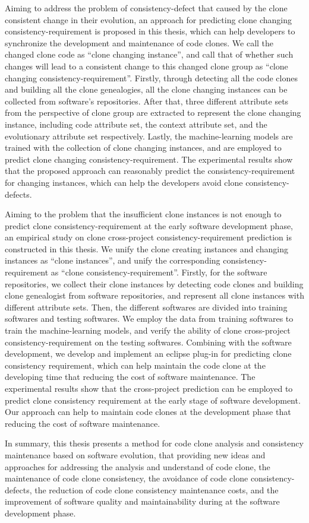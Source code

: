 {Aiming to address the problem of consistency-defect that caused by the clone consistent change in their evolution, an approach for predicting clone changing consistency-requirement is proposed in this thesis, which can help developers to synchronize the development and maintenance of code clones. 
We call the changed clone code as ``clone changing instance'', and call that of whether such changes will lead to a consistent change to this changed clone group as ``clone changing consistency-requirement''.
Firstly, through detecting all the code clones and building all the clone genealogies, all the clone changing instances can be collected from software's repositories.
After that, three different attribute sets from the perspective of clone group are extracted to represent the clone changing instance, including code attribute set, the context attribute set, and the evolutionary attribute set respectively.
Lastly, the machine-learning models are trained with the collection of clone changing instances, and are employed to predict clone changing consistency-requirement.
The experimental results show that the proposed approach can reasonably predict the consistency-requirement for changing instances, which can help the developers avoid clone consistency-defects.

Aiming to the problem that the insufficient clone instances is not enough to predict clone consistency-requirement at the early software development phase, an empirical study on clone cross-project consistency-requirement prediction is constructed in this thesis.
We unify the clone creating instances and changing instances as ``clone instances'', and unify the corresponding consistency-requirement as ``clone consistency-requirement''.
Firstly, for the software repositories, we collect their clone instances by detecting code clones and building clone genealogist from software repositories, and represent all clone instances with different attribute sets.
Then, the different softwares are divided into training softwares and testing softwares.
We employ the data from training softwares to train the machine-learning models, and verify the ability of clone cross-project consistency-requirement on the testing softwares.
Combining with the software development, we develop and implement an eclipse plug-in for predicting clone consistency requirement, which can help maintain the code clone at the developing time that reducing the cost of software maintenance.
The experimental results show that the cross-project prediction can be employed to predict clone consistency requirement at the early stage of software development.
Our approach can help to maintain code clones at the development phase that reducing the cost of software maintenance.

In summary, this thesis presents a method for code clone analysis and consistency maintenance based on software evolution, that providing new ideas and approaches for addressing the analysis and understand of code clone, the maintenance of code clone consistency, the avoidance of code clone consistency-defects, the reduction of code clone consistency maintenance costs, and the improvement of software quality and maintainability during at the software development phase.
}

\makecover
\clearpage 
